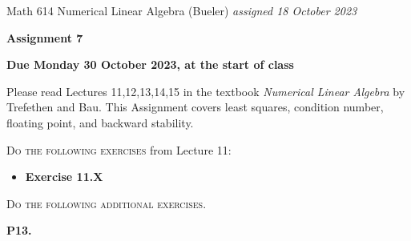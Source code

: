 \documentclass[12pt]{amsart}
\newcommand{\prob}[1]{\bigskip\noindent\textbf{#1.}\quad }
\begin{document}
\scriptsize \noindent Math 614 Numerical Linear Algebra (Bueler) \hfill \emph{assigned 18 October 2023}
\normalsize\medskip

\Large\centerline{\textbf{Assignment 7}}
\large
\medskip

\centerline{\textbf{Due Monday 30 October 2023, at the start of class}}
\medskip
\normalsize

\thispagestyle{empty}

\bigskip
\noindent Please read Lectures 11,12,13,14,15 in the textbook \emph{Numerical Linear Algebra} by Trefethen and Bau.  This Assignment covers least squares, condition number, floating point, and backward stability.

\bigskip
\noindent \textsc{Do the following exercises} from Lecture 11:

\begin{itemize}
\item \textbf{Exercise 11.X}
\end{itemize}


\bigskip
\noindent \textsc{Do the following additional exercises.}

\medskip

\prob{P13}  
\end{document}
